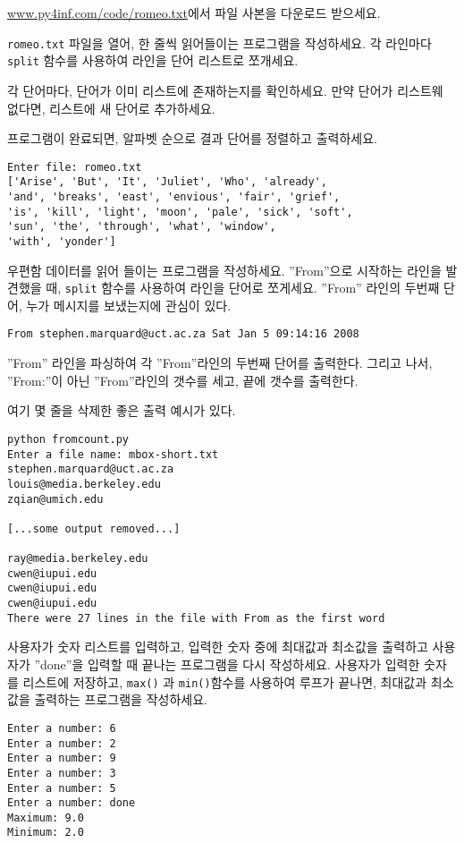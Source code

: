 \begin{ex}


\url{www.py4inf.com/code/romeo.txt}에서 파일 사본을 다운로드 받으세요.

{\tt romeo.txt} 파일을 열어, 한 줄씩 읽어들이는 프로그램을 작성하세요.
각 라인마다 {\tt split} 함수를 사용하여 라인을 단어 리스트로 쪼개세요.

각 단어마다, 단어가 이미 리스트에 존재하는지를 확인하세요. 만약 단어가 리스트웨 없다면, 리스트에 새 단어로 추가하세요.

프로그램이 완료되면, 알파벳 순으로 결과 단어를 정렬하고 출력하세요.

\begin{verbatim}
Enter file: romeo.txt
['Arise', 'But', 'It', 'Juliet', 'Who', 'already', 
'and', 'breaks', 'east', 'envious', 'fair', 'grief', 
'is', 'kill', 'light', 'moon', 'pale', 'sick', 'soft', 
'sun', 'the', 'through', 'what', 'window', 
'with', 'yonder']
\end{verbatim}
\end{ex}

\begin{ex}

우편함 데이터를 읽어 들이는 프로그램을 작성하세요.
''From''으로 시작하는 라인을 발견했을 때, {\tt split} 함수를 사용하여 라인을 단어로 쪼게세요.
''From'' 라인의 두번째 단어, 누가 메시지를 보냈는지에 관심이 있다.


{\tt From stephen.marquard@uct.ac.za Sat Jan  5 09:14:16 2008 }

''From'' 라인을 파싱하여 각 ''From''라인의 두번째 단어를 출력한다.
그리고 나서, ''From:''이 아닌 ''From''라인의 갯수를 세고, 끝에 갯수를 출력한다.

여기 몇 줄을 삭제한 좋은 출력 예시가 있다.

\beforeverb
\begin{verbatim}
python fromcount.py 
Enter a file name: mbox-short.txt
stephen.marquard@uct.ac.za
louis@media.berkeley.edu
zqian@umich.edu

[...some output removed...]

ray@media.berkeley.edu
cwen@iupui.edu
cwen@iupui.edu
cwen@iupui.edu
There were 27 lines in the file with From as the first word
\end{verbatim}
\afterverb
%
\end{ex}

\begin{ex}

사용자가 숫자 리스트를 입력하고, 입력한 숫자 중에 최대값과 최소값을 출력하고 사용자가 ''done''을 입력할 때 끝나는 프로그램을 다시 작성하세요.
사용자가 입력한 숫자를 리스트에 저장하고, {\tt max()} 과 {\tt min()}함수를 사용하여 루프가 끝나면, 최대값과 최소값을 출력하는 프로그램을 작성하세요.

\beforeverb
\begin{verbatim}
Enter a number: 6
Enter a number: 2
Enter a number: 9
Enter a number: 3
Enter a number: 5
Enter a number: done
Maximum: 9.0
Minimum: 2.0
\end{verbatim}
\afterverb
%

\end{ex}

